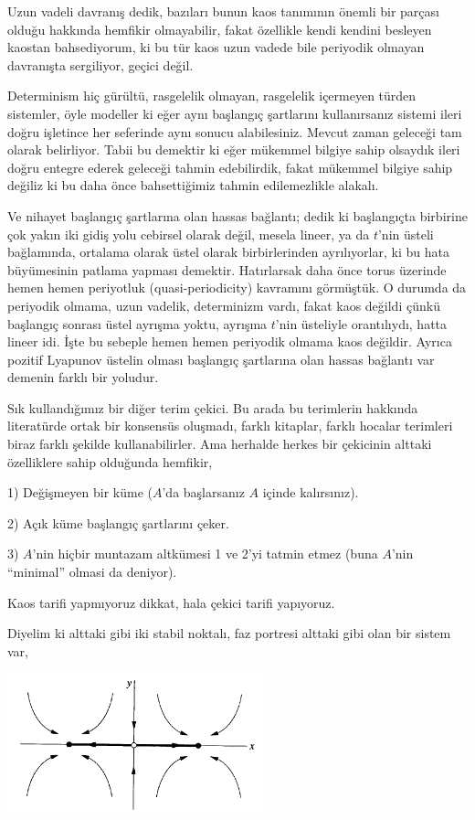 \documentclass[12pt,fleqn]{article}\usepackage{../../common}
\begin{document}
Uzun vadeli davranış dedik, bazıları bunun kaos tanımının önemli bir
parçası olduğu hakkında hemfikir olmayabilir, fakat özellikle kendi kendini
besleyen kaostan bahsediyorum, ki bu tür kaos uzun vadede bile periyodik
olmayan davranışta sergiliyor, geçici değil. 

Determinism hiç gürültü, rasgelelik olmayan, rasgelelik içermeyen türden
sistemler, öyle modeller ki eğer aynı başlangıç şartlarını kullanırsanız
sistemi ileri doğru işletince her seferinde aynı sonucu
alabilesiniz. Mevcut zaman geleceği tam olarak belirliyor. Tabii bu
demektir ki eğer mükemmel bilgiye sahip olsaydık ileri doğru entegre
ederek geleceği tahmin edebilirdik, fakat mükemmel bilgiye sahip değiliz ki
bu daha önce bahsettiğimiz tahmin edilemezlikle alakalı. 

Ve nihayet başlangıç şartlarına olan hassas bağlantı; dedik ki başlangıçta
birbirine çok yakın iki gidiş yolu cebirsel olarak değil, mesela lineer, ya
da $t$'nin üsteli bağlamında, ortalama olarak üstel olarak birbirlerinden
ayrılıyorlar, ki bu hata büyümesinin patlama yapması demektir. Hatırlarsak
daha önce torus üzerinde hemen hemen periyotluk (quasi-periodicity)
kavramını görmüştük. O durumda da periyodik olmama, uzun vadelik,
determinizm vardı, fakat kaos değildi çünkü başlangıç sonrası üstel ayrışma
yoktu, ayrışma $t$'nin üsteliyle orantılıydı, hatta lineer idi. İşte bu
sebeple hemen hemen periyodik olmama kaos değildir. Ayrıca pozitif Lyapunov
üstelin olması başlangıç şartlarına olan hassas bağlantı var demenin farklı
bir yoludur. 

Sık kullandığımız bir diğer terim çekici. Bu arada bu terimlerin hakkında
literatürde ortak bir konsensüs oluşmadı, farklı kitaplar, farklı hocalar
terimleri biraz farklı şekilde kullanabilirler. Ama herhalde herkes bir
çekicinin alttaki özelliklere sahip olduğunda hemfikir, 

1) Değişmeyen bir küme ($A$'da başlarsanız $A$ içinde kalırsınız).

2) Açık küme başlangıç şartlarını çeker.

3) $A$'nin hiçbir muntazam altkümesi 1 ve 2'yi tatmin etmez (buna $A$'nin
``minimal'' olmasi da deniyor).

Kaos tarifi yapmıyoruz dikkat, hala çekici tarifi yapıyoruz. 

Diyelim ki alttaki gibi iki stabil noktalı, faz portresi alttaki gibi
olan bir sistem var,

\includegraphics[width=20em]{18_01.png}
\end{document}
